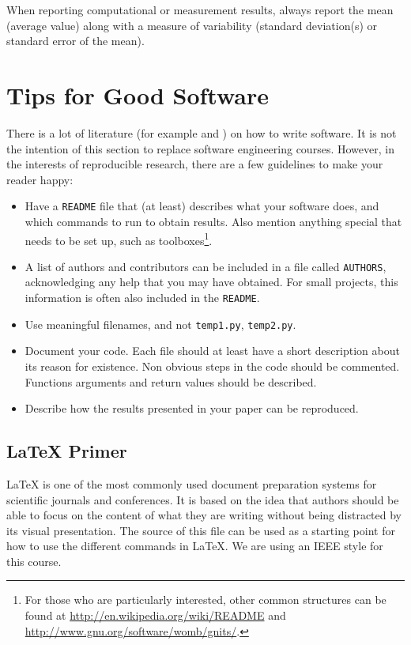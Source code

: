 \documentclass[10pt,conference,compsocconf]{IEEEtran}
\begin{document}
When reporting computational or measurement results, always
report the mean (average value) along with a measure of variability
(standard deviation(s) or standard error of the mean).


\section{Tips for Good Software}
\label{sec:tips-software}

There is a lot of literature (for example and
) on how to write software. It is not the
intention of this section to replace software engineering
courses. However, in the interests of reproducible
research, there are a few guidelines to make your
reader happy:
\begin{itemize}
\item Have a \texttt{README} file that (at least) describes what your
  software does, and which commands to run to obtain results. Also
  mention anything special that needs to be set up, such as
  toolboxes\footnote{For those who are
  particularly interested, other common structures can be found at
  \url{http://en.wikipedia.org/wiki/README} and
  \url{http://www.gnu.org/software/womb/gnits/}.}.
\item A list of authors and contributors can be included in a file
  called \texttt{AUTHORS}, acknowledging any help that you may have
  obtained. For small projects, this information is often also
  included in the \texttt{README}.
\item Use meaningful filenames, and not \texttt{temp1.py},
  \texttt{temp2.py}. 
\item Document your code. Each file should at least have a short
  description about its reason for existence. Non obvious steps in the
  code should be commented. Functions arguments and return values should be described.
\item Describe how the results presented in your paper can be reproduced.
\end{itemize}


\subsection{\LaTeX{} Primer}
\label{sec:latex-primer}

\LaTeX{} is one of the most commonly used document preparation systems
for scientific journals and conferences. It is based on the idea
that authors should be able to focus on the content of what they are
writing without being distracted by its visual presentation.
The source of this file can be used as a starting point for how to use
the different commands in \LaTeX{}. We are using an IEEE style for
this course.
\end{document}
